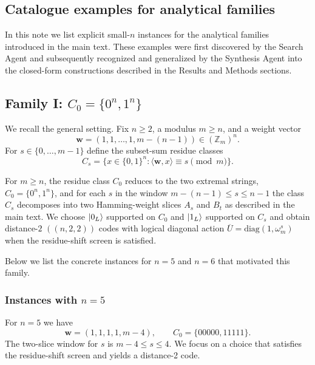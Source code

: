 \documentclass[pdflatex,sn-nature]{sn-jnl}%
\theoremstyle{thmstyleone}%
\theoremstyle{thmstyletwo}%
\theoremstyle{thmstylethree}%
\begin{document}
\begin{appendices}
\section{Catalogue examples for analytical families}
\label{supp:families-examples}

In this note we list explicit small-$n$ instances for the analytical families introduced in the main text. These examples were first discovered by the Search Agent and subsequently recognized and generalized by the Synthesis Agent into the closed-form constructions described in the Results and Methods sections.

\subsection{Family I: $C_0=\{0^n,1^n\}$}
\label{subsubsec:supp:family1}

We recall the general setting. 
Fix $n\ge 2$, a modulus $m\ge n$, and a weight vector
\[
  \mathbf w=(1,1,\dots,1,m-(n-1))\in(\mathbb Z_m)^n .
\]
For $s\in\{0,\dots,m-1\}$ define the subset-sum residue classes
\[
  C_s=\{x\in\{0,1\}^n : \langle \mathbf w,x\rangle \equiv s \pmod m\}.
\]

For $m\ge n$, the residue class $C_0$ reduces to the two extremal strings,
$C_0=\{0^n,1^n\}$, and for each $s$ in the window $m-(n-1)\le s\le n-1$ the class $C_s$ decomposes into two Hamming-weight slices $A_s$ and $B_t$ as described in the main text. 
We choose $\ket{0_L}$ supported on $C_0$ and $\ket{1_L}$ supported on $C_s$ and obtain distance-$2$ $((n,2,2))$ codes with logical diagonal action $\overline U=\mathrm{diag}(1,\omega_m^s)$ when the residue-shift screen is satisfied.

Below we list the concrete instances for $n=5$ and $n=6$ that motivated this family.

\subsubsection{Instances with $n=5$}

For $n=5$ we have
\[
  \mathbf w=(1,1,1,1,m-4),\qquad
  C_0=\{00000,11111\}.
\]
The two-slice window for $s$ is
$m-4\le s\le 4$. We focus on a choice that satisfies the residue-shift screen and yields a distance-2 code.


\end{appendices}
\end{document}
